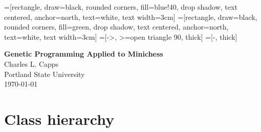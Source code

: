 \documentclass{article}
\newcommand{\bo}[1]{\textbf{#1}}
\begin{document}
=[rectangle, draw=black, rounded corners, fill=blue!40, drop shadow,
        text centered, anchor=north, text=white, text width=3cm]
=[rectangle, draw=black, rounded corners, fill=green, drop shadow,
        text centered, anchor=north, text=white, text width=3cm]
=[->, >=open triangle 90, thick]
=[-, thick]

\begin{center}
\LARGE{\bo{Genetic Programming Applied to Minichess}} \\
\Large{Charles L. Capps\\
Portland State University} \\ 
\today \\

\end{center}
\section{Class hierarchy}
\end{document}
